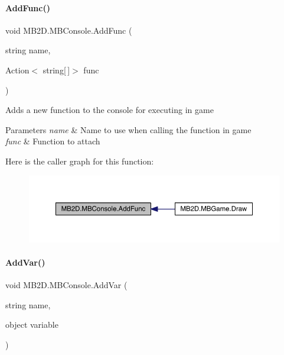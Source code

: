 \paragraph{\texorpdfstring{Add\+Func()}{AddFunc()}}
{\footnotesize\ttfamily void M\+B2\+D.\+M\+B\+Console.\+Add\+Func (\begin{DoxyParamCaption}\item[{string}]{name,  }\item[{Action$<$ string\mbox{[}$\,$\mbox{]}$>$}]{func }\end{DoxyParamCaption})\hspace{0.3cm}{\ttfamily [inline]}}



Adds a new function to the console for executing in game 


\begin{DoxyParams}{Parameters}
{\em name} & Name to use when calling the function in game\\
\hline
{\em func} & Function to attach\\
\hline
\end{DoxyParams}
Here is the caller graph for this function\+:
\nopagebreak
\begin{figure}[H]
\begin{center}
\leavevmode
\includegraphics[width=350pt]{class_m_b2_d_1_1_m_b_console_a3c515ad4a199b0b67049df57fce7cb3f_icgraph}
\end{center}
\end{figure}
\hypertarget{class_m_b2_d_1_1_m_b_console_aeff7888e763a415aeccadc347e09828d}{}\label{class_m_b2_d_1_1_m_b_console_aeff7888e763a415aeccadc347e09828d} 
\paragraph{\texorpdfstring{Add\+Var()}{AddVar()}}
{\footnotesize\ttfamily void M\+B2\+D.\+M\+B\+Console.\+Add\+Var (\begin{DoxyParamCaption}\item[{string}]{name,  }\item[{object}]{variable }\end{DoxyParamCaption})\hspace{0.3cm}{\ttfamily [inline]}}



